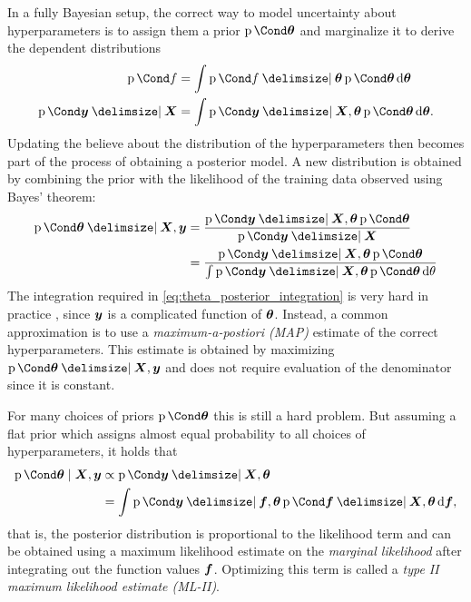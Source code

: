 In a fully Bayesian setup, the correct way to model uncertainty about hyperparameters is to assign them a prior $\Prob{\mat{\theta}}$ and marginalize it to derive the dependent distributions
\begin{align}
    \Prob{f} &= \int \Prob{f \given \mat{\theta}} \Prob{\mat{\theta}} \diff \mat{\theta} \\
    \Prob{\mat{y} \given \mat{X}} &= \int \Prob{\mat{y} \given \mat{X}, \mat{\theta}} \Prob{\mat{\theta}} \diff \mat{\theta}. \label{eq:theta_posterior_integration}
\end{align}
Updating the believe about the distribution of the hyperparameters then becomes part of the process of obtaining a posterior model.
A new distribution is obtained by combining the prior with the likelihood of the training data observed using Bayes' theorem:
\begin{align}
    \Prob{\mat{\theta} \given \mat{X}, \mat{y}} &= \frac{\Prob{\mat{y} \given \mat{X}, \mat{\theta}} \Prob{\mat{\theta}}}{\Prob{\mat{y} \given \mat{X}}} \\ &= \frac{\Prob{\mat{y} \given \mat{X}, \mat{\theta}} \Prob{\mat{\theta}}}{\int \Prob{\mat{y} \given \mat{X}, \mat{\theta}} \Prob{\mat{\theta}} \diff \theta}
\end{align}
The integration required in \cref{eq:theta_posterior_integration} is very hard in practice \cite[109]{rasmussen_gaussian_2006}, since $\bm{y}$ is a complicated function of $\bm{\theta}$.
Instead, a common approximation is to use a \emph{maximum-a-postiori (MAP)} estimate of the correct hyperparameters.
This estimate is obtained by maximizing $\Prob{\mat{\theta} \given \mat{X}, \mat{y}}$ and does not require evaluation of the denominator since it is constant.

For many choices of priors $\Prob{\mat{\theta}}$ this is still a hard problem.
But assuming a flat prior which assigns almost equal probability to all choices of hyperparameters, it holds that
\begin{align}
    \Prob{\mat{\theta} \mid \mat{X}, \mat{y}} &\propto \Prob{\mat{y} \given \mat{X}, \mat{\theta}} \\
    &= \int \Prob{\mat{y} \given \mat{f}, \mat{\theta}} \Prob{\mat{f} \given \mat{X}, \mat{\theta}} \diff \mat{f},
\end{align}
that is, the posterior distribution is proportional to the likelihood term and can be obtained using a maximum likelihood estimate on the \emph{marginal likelihood} after integrating out the function values $\bm{f}$.
Optimizing this term is called a \emph{type II maximum likelihood estimate (ML-II)}.

